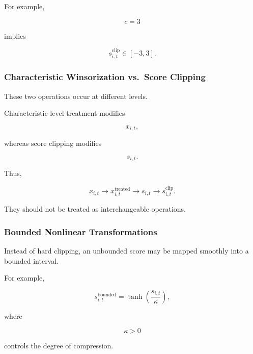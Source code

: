 \documentclass[11pt,a4paper]{article}
\begin{document}
For example,

\begin{equation}
c=3
\end{equation}

implies

\begin{equation}
s_{i,t}^{\mathrm{clip}}
\in
[-3,3].
\end{equation}


\subsubsection{Characteristic Winsorization vs.\ Score Clipping}

These two operations occur at different levels.

Characteristic-level treatment modifies

\begin{equation}
x_{i,t},
\end{equation}

whereas score clipping modifies

\begin{equation}
s_{i,t}.
\end{equation}

Thus,

\begin{equation}
\boxed{
x_{i,t}
\rightarrow
x_{i,t}^{\mathrm{treated}}
\rightarrow
s_{i,t}
\rightarrow
s_{i,t}^{\mathrm{clip}}.
}
\end{equation}

They should not be treated as interchangeable operations.


\subsubsection{Bounded Nonlinear Transformations}

Instead of hard clipping, an unbounded score may be mapped smoothly into a
bounded interval.

For example,

\begin{equation}
\boxed{
s_{i,t}^{\mathrm{bounded}}
=
\tanh
\left(
\frac{s_{i,t}}{\kappa}
\right),
}
\end{equation}

where

\begin{equation}
\kappa>0
\end{equation}

controls the degree of compression.
\end{document}
